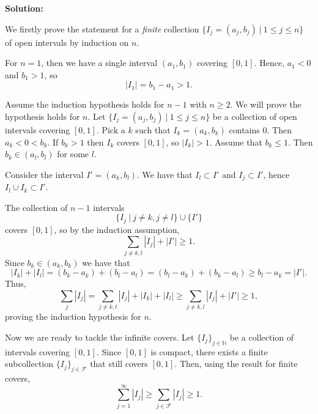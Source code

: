 \documentclass[12pt]{article}
\renewcommand\|{\ | \ }
\newcommand\mc\mathcal
\newcommand\N{\mathbb{N}}
\def\sol{\textbf{Solution:}}
\def\sumint#1{\sum_{#1=1}^\infty}
\begin{document}
\sol

We firstly prove the statement for a \emph{finite} collection
$\{I_j = (a_j, b_j) \| 1 \leq j \leq n\}$ of open intervals by induction on 
$n$.

For $n = 1$, then we have a single interval $(a_1, b_1)$ covering $[0, 1]$.
Hence, $a_1 < 0$ and $b_1 > 1$, so
\[
|I_1| = b_1 - a_1 > 1.
\]

Assume the induction hypothesis holds for $n - 1$ with $n \geq 2$. 
We will prove the 
hypothesis holds for $n$. Let $\{I_j = (a_j, b_j) \| 1 \leq j \leq n\}$
be a collection of open intervals covering $[0, 1]$. Pick a $k$ such that 
$I_k = (a_k, b_k)$ contains 0. Then $a_k < 0 < b_k$.
If $b_k > 1$ then $I_k$ covers $[0, 1]$, so
$|I_k| > 1$. Assume that $b_k \leq 1$. Then $b_k \in (a_l, b_l)$ for some $l$.

Consider the interval $I' = (a_k, b_l)$. We have that $I_l \subset I'$ and
$I_j \subset I'$, hence $I_l \cup I_k \subset I'$.

The collection of $n - 1$ intervals
\[
\{I_j \| j \neq k, j \neq l\} \cup \{I'\}
\]
covers $[0, 1]$, so by the induction assumption,
\[
\sum_{j \neq k,l} |I_j| + |I'| \geq 1.
\]
Since $b_k \in (a_k, b_k)$ we have that
\[
|I_k| + |I_l| = (b_k - a_k) + (b_l - a_l) = (b_l - a_k) + (b_k - a_l) 
\geq b_l - a_k = |I'|.
\]
Thus,
\[
\sum_j |I_j| = \sum_{j \neq k, l} |I_j| + |I_k| + |I_l| \geq
\sum_{j \neq k,l} |I_j| + |I'| \geq 1,
\]
proving the induction hypothesis for $n$.

Now we are ready to tackle the infinite covers. Let $\{I_j\}_{j \in \N}$ 
be a collection of intervals covering $[0, 1]$. Since $[0, 1]$ is compact,
there exists a finite subcollection $\{I_j\}_{j \in \mc F}$ that 
still covers $[0, 1]$. Then, using the result for finite covers,
\[
\sumint j |I_j| \geq \sum_{j \in \mc F} |I_j| \geq 1.
\]
\end{document}
